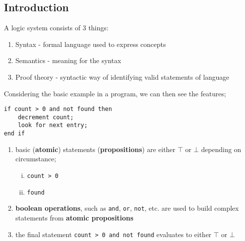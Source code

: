 \documentclass[a4paper, 12pt]{article}
\begin{document}
        \subsection*{Introduction}
        A logic system consists of 3 things:
        \begin{enumerate}[1.]
            \item Syntax - formal language used to express concepts
            \item Semantics - meaning for the syntax
            \item Proof theory - syntactic way of identifying valid statements of language
        \end{enumerate}
        Considering the basic example in a program, we can then see the features;
        \begin{verbatim}
if count > 0 and not found then
    decrement count;
    look for next entry;
end if
        \end{verbatim}
        \begin{enumerate}[1.]
            \item basic (\textbf{atomic}) statements (\textbf{propositions}) are either $\top$ or $\bot$ depending on circumstance;
                \begin{enumerate}[i.]
                    \item \texttt{count > 0}
                    \item \texttt{found}
                \end{enumerate}
            \item \textbf{boolean operations}, such as \texttt{and}, \texttt{or}, \texttt{not}, etc. are used to build complex statements from \textbf{atomic propositions}
            \item the final statement \texttt{count > 0 and not found} evaluates to either $\top$ or $\bot$
        \end{enumerate}
\end{document}
